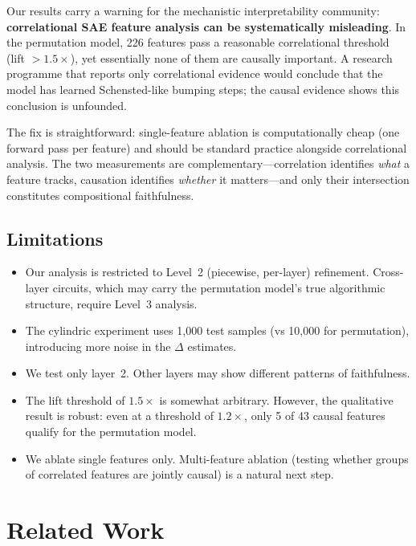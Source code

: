\documentclass[10pt]{article}
\begin{document}
Our results carry a warning for the mechanistic interpretability community:
\textbf{correlational SAE feature analysis can be systematically misleading}.
In the permutation model, 226 features pass a reasonable correlational
threshold (lift $> 1.5\times$), yet essentially none of them are causally
important. A research programme that reports only correlational evidence
would conclude that the model has learned Schensted-like bumping steps; the
causal evidence shows this conclusion is unfounded.

The fix is straightforward: single-feature ablation is computationally cheap
(one forward pass per feature) and should be standard practice alongside
correlational analysis. The two measurements are complementary---correlation
identifies \emph{what} a feature tracks, causation identifies \emph{whether}
it matters---and only their intersection constitutes compositional
faithfulness.

\subsection{Limitations}

\begin{itemize}
\item Our analysis is restricted to Level~2 (piecewise, per-layer)
refinement. Cross-layer circuits, which may carry the permutation model's
true algorithmic structure, require Level~3 analysis.

\item The cylindric experiment uses 1,000 test samples (vs 10,000 for
permutation), introducing more noise in the $\Delta$ estimates.

\item We test only layer~2. Other layers may show different patterns of
faithfulness.

\item The lift threshold of $1.5\times$ is somewhat arbitrary. However, the
qualitative result is robust: even at a threshold of $1.2\times$, only 5 of
43 causal features qualify for the permutation model.

\item We ablate single features only. Multi-feature ablation (testing whether
groups of correlated features are jointly causal) is a natural next step.
\end{itemize}

\section{Related Work}
\end{document}
